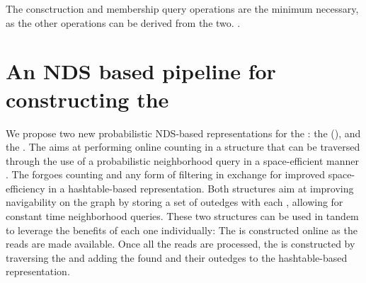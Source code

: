 The consctruction and membership query operations are the minimum necessary, as the other operations can be derived from the two. .

\section{An NDS based pipeline for constructing the \dBG}


We propose two new probabilistic NDS-based representations for the \dBG: the \dB \cm (\dBCM), and the \dBHT. The \dBCM aims at performing online \kmer counting in a structure that can be traversed through the use of a probabilistic neighborhood query in a space-efficient manner . The \dBHT forgoes \kmer counting and any form of filtering in exchange for improved space-efficiency in a hashtable-based representation. Both structures aim at improving navigability on the graph by storing a set of outedges with each \kmer, allowing for constant time neighborhood queries. These two structures can be used in tandem to leverage the benefits of each one individually: The \dBCM is constructed online as the reads are made available. Once all the reads are processed, the \dBHT is constructed by traversing the \dBCM and adding the found  and their outedges to the hashtable-based representation.

\section{\cm}
\label{sec:countmin}

